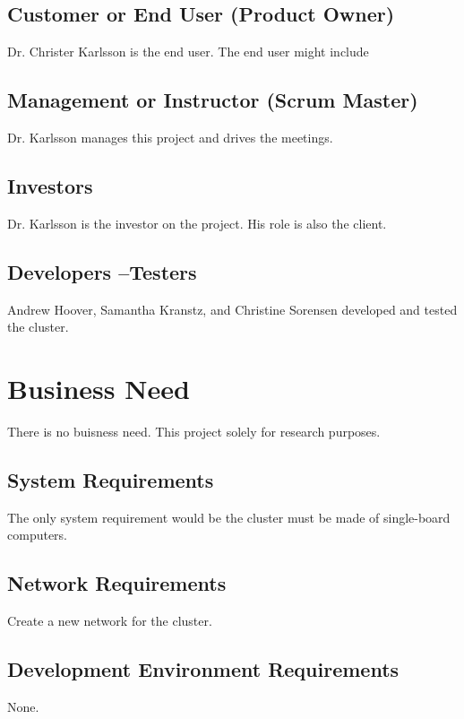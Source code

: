 \subsection{Customer or End User (Product Owner)}
Dr. Christer Karlsson is the end user.  The end user might include 


\subsection{Management or Instructor (Scrum Master)}
Dr. Karlsson manages this project and drives the meetings.


\subsection{Investors}
Dr. Karlsson is the investor on the project. His role is also the client.

\subsection{Developers --Testers}
Andrew Hoover, Samantha Kranstz, and Christine Sorensen developed and tested 
the cluster. 


\section{Business Need}
There is no buisness need. This project solely for research purposes.  


\subsection{System  Requirements}
The only system requirement would be the cluster must be made of single-board
computers.


\subsection{Network Requirements}
Create a new network for the cluster.


\subsection{Development Environment Requirements}
None. 


